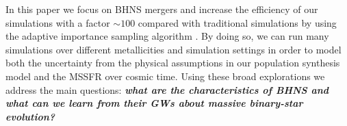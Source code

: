 \documentclass[twocolumn]{aastex63}
\newcommand\bhnsSingle{BHNS\xspace}
\begin{document}





%

In this paper we 
focus on \bhnsSingle mergers and  increase the efficiency of our simulations with a factor $\sim 100$ compared with traditional simulations by  using the adaptive importance sampling algorithm  {} \citep{2019MNRAS.490.5228B}.  By doing so, we can run many simulations over different metallicities and simulation settings in order to model both the uncertainty from  the physical assumptions in our population synthesis model and  the \ac{MSSFR} over cosmic time.  Using these broad explorations we address the main questions: \textit{\textbf{ what are the characteristics of \bhnsSingle  and what can we learn from their \acp{GW} about massive binary-star evolution?}}









%
%
\end{document}
